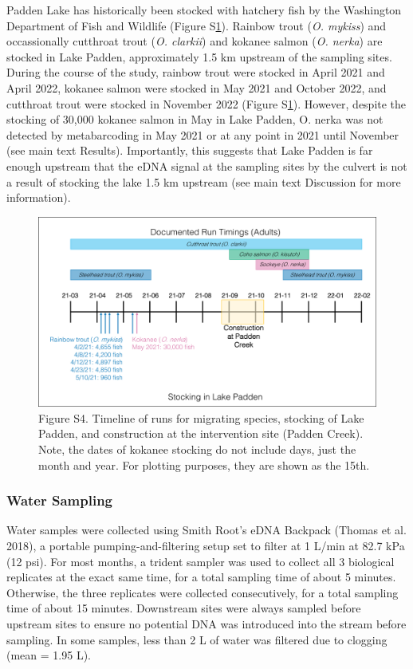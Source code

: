 \documentclass[
]{article}
\begin{document}
Padden Lake has historically been stocked with hatchery fish by the
Washington Department of Fish and Wildlife (Figure S\ref{fig:timeline}).
Rainbow trout (\emph{O. mykiss}) and occassionally cutthroat trout
(\emph{O. clarkii}) and kokanee salmon (\emph{O. nerka}) are stocked in
Lake Padden, approximately 1.5 km upstream of the sampling sites. During
the course of the study, rainbow trout were stocked in April 2021 and
April 2022, kokanee salmon were stocked in May 2021 and October 2022,
and cutthroat trout were stocked in November 2022 (Figure
S\ref{fig:timeline}). However, despite the stocking of 30,000 kokanee
salmon in May in Lake Padden, O. nerka was not detected by metabarcoding
in May 2021 or at any point in 2021 until November (see main text
Results). Importantly, this suggests that Lake Padden is far enough
upstream that the eDNA signal at the sampling sites by the culvert is
not a result of stocking the lake 1.5 km upstream (see main text
Discussion for more information).

\begin{figure}
\centering
\includegraphics{../Output/SupplementalFigures/TimeLine.pdf}
\caption{Figure S4. Timeline of runs for migrating species, stocking of
Lake Padden, and construction at the intervention site (Padden Creek).
Note, the dates of kokanee stocking do not include days, just the month
and year. For plotting purposes, they are shown as the
15th.\label{fig:timeline}}
\end{figure}

\hypertarget{water-sampling}{%
\subsubsection{Water Sampling}\label{water-sampling}}

Water samples were collected using Smith Root's eDNA Backpack (Thomas et
al. 2018), a portable pumping-and-filtering setup set to filter at 1
L/min at 82.7 kPa (12 psi). For most months, a trident sampler was used
to collect all 3 biological replicates at the exact same time, for a
total sampling time of about 5 minutes. Otherwise, the three replicates
were collected consecutively, for a total sampling time of about 15
minutes. Downstream sites were always sampled before upstream sites to
ensure no potential DNA was introduced into the stream before sampling.
In some samples, less than 2 L of water was filtered due to clogging
(mean = 1.95 L).
\end{document}
